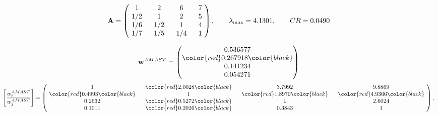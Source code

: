 \begin{example}
\begin{equation*}
\mathbf{A} =
\begin{pmatrix}
$\,\,$ 1 $\,\,$ & $\,\,$2$\,\,$ & $\,\,$6$\,\,$ & $\,\,$7 $\,\,$ \\
$\,\,$ 1/2$\,\,$ & $\,\,$ 1 $\,\,$ & $\,\,$2$\,\,$ & $\,\,$5 $\,\,$ \\
$\,\,$ 1/6$\,\,$ & $\,\,$ 1/2$\,\,$ & $\,\,$ 1 $\,\,$ & $\,\,$4 $\,\,$ \\
$\,\,$ 1/7$\,\,$ & $\,\,$ 1/5$\,\,$ & $\,\,$ 1/4$\,\,$ & $\,\,$ 1  $\,\,$ \\
\end{pmatrix},
\qquad
\lambda_{\max} =
4.1301,
\qquad
CR = 0.0490
\end{equation*}

\begin{equation*}
\mathbf{w}^{AMAST} =
\begin{pmatrix}
0.536577\\
\color{red} 0.267918\color{black} \\
0.141234\\
0.054271
\end{pmatrix}\end{equation*}
\begin{equation*}
\left[ \frac{{w}^{AMAST}_i}{{w}^{AMAST}_j} \right] =
\begin{pmatrix}
$\,\,$ 1 $\,\,$ & $\,\,$\color{red} 2.0028\color{black} $\,\,$ & $\,\,$3.7992$\,\,$ & $\,\,$9.8869$\,\,$ \\
$\,\,$\color{red} 0.4993\color{black} $\,\,$ & $\,\,$ 1 $\,\,$ & $\,\,$\color{red} 1.8970\color{black} $\,\,$ & $\,\,$\color{red} 4.9366\color{black}   $\,\,$ \\
$\,\,$0.2632$\,\,$ & $\,\,$\color{red} 0.5272\color{black} $\,\,$ & $\,\,$ 1 $\,\,$ & $\,\,$2.6024 $\,\,$ \\
$\,\,$0.1011$\,\,$ & $\,\,$\color{red} 0.2026\color{black} $\,\,$ & $\,\,$0.3843$\,\,$ & $\,\,$ 1  $\,\,$ \\
\end{pmatrix},
\end{equation*}


\end{example}

